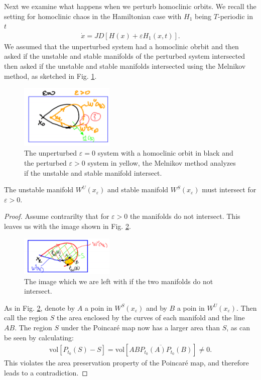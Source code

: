 Next we examine what happens when we perturb homoclinic orbits. We recall the setting for homoclinic chaos in the Hamiltonian case with $H_1$ being $T$-periodic in $t$
\begin{align}
	\dot{x} = JD[H(x) + \varepsilon H_{1}(x,t)].
\end{align}
We assumed that the unperturbed system had a homoclinic obrbit and then asked if the unstable and stable manifolds of the perturbed system intersected then asked if the unstable and stable manifolds intersected using the Melnikov method, as sketched in Fig. \ref{fig:ham_melnikov_method}.
\begin{figure}[h!]
	\centering
	\includegraphics[width=0.4\textwidth]{figures/ch8/8ham_melnikov_method.png}
	\caption{The unperturbed $\varepsilon=0$ system with a homoclinic orbit in black and the perturbed $\varepsilon>0$ system in yellow, the Melnikov method analyzes if the unstable and stable manifold intersect.}
	\label{fig:ham_melnikov_method}
\end{figure}

\begin{proposition}[]
	The unstable manifold $W^{U}(x_{\varepsilon})$ and stable manifold $W^{S}(x_{\varepsilon})$ must intersect for $\varepsilon>0$.
\end{proposition}
\begin{proof}
	Assume contrarilty that for $\varepsilon>0$ the manifolds do not intersect. This leaves us with the image shown in Fig. \ref{fig:contradiction_assumption}.
	\begin{figure}[h!]
		\centering
		\includegraphics[width=0.4\textwidth]{figures/ch8/9contradiction_assumption.png}
		\caption{The image which we are left with if the two manifolds do not intersect.}
		\label{fig:contradiction_assumption}
	\end{figure}

	As in Fig. \ref{fig:contradiction_assumption}, denote by $A$ a poin in $ W^{S}(x_\varepsilon)$ and by $B$ a poin in $W^{U}(x_{\varepsilon})$. Then call the region $S$ the area enclosed by the curves of each manifold and the line $AB$. The region $S$ under the  Poincaré map now has a larger area than $S$, as can be seen by calculating:
\begin{align}
	\textrm{vol}[P_{t_0}(S) - S] =  \textrm{vol} [\overline{ABP_{t_0}(A)P_{t_0}(B)}] \neq 0.
\end{align}
This violates the area preservation property of the Poincaré map, and therefore leads to a contradiction.
\end{proof}

